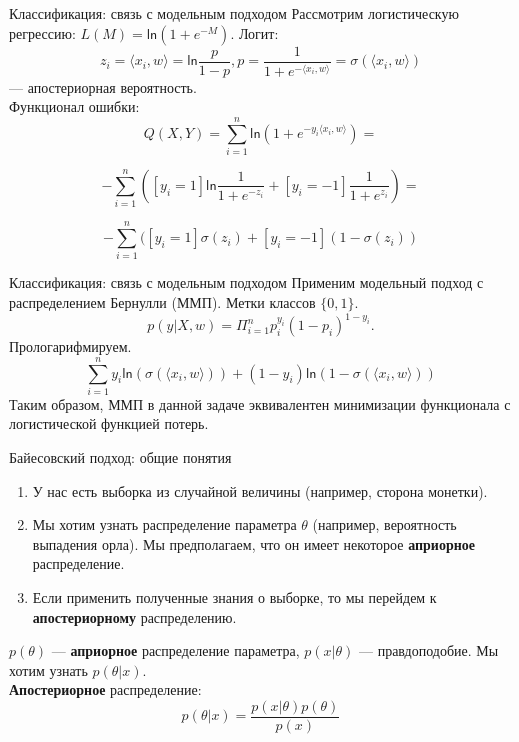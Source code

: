 \documentclass[handout]{beamer}
\begin{document}
\begin{frame}{Классификация: связь с модельным подходом}
	Рассмотрим логистическую регрессию: $L(M)= \mathsf{ln}(1+e^{-M})$.
	Логит:
	\begin{equation}
		z_i=\langle x_i, w\rangle = \mathsf{ln}\frac{p}{1 - p}, p = \frac{1}{1+e^{-\langle x_i, w\rangle}}=\sigma(\langle x_i, w\rangle)
	\end{equation}
	--- апостериорная вероятность. \\
	Функционал ошибки:
	\begin{equation*}
		Q(X, Y) = \sum_{i=1}^{n}\mathsf{ln}(1+e^{-y_i\langle x_i, w\rangle}) =
	\end{equation*}

	\begin{equation*}
 -\sum_{i=1}^n([y_i=1]\mathsf{ln}\frac{1}{1+e^{-z_i}}+[y_i=-1]\frac{1}{1+e^{z_i}})=
	\end{equation*}

	\begin{equation*}
	-\sum_{i=1}^n([y_i=1]\sigma(z_i)+[y_i=-1](1-\sigma(z_i))
	\end{equation*}
\end{frame}

\begin{frame}{Классификация: связь с модельным подходом}
	Применим модельный подход с распределением Бернулли (ММП). Метки классов $\{0, 1\}$.
	\begin{equation}
		p(y|X, w)=\Pi_{i=1}^np_i^{y_i}(1-p_i)^{1-y_i}.
	\end{equation} 
	Прологарифмируем.
	\begin{equation}
		 \sum_{i=1}^ny_i\mathsf{ln}(\sigma(\langle x_i, w\rangle)) + (1-y_i)\mathsf{ln}(1-\sigma(\langle x_i, w\rangle))
	\end{equation}
	Таким образом, ММП в данной задаче эквивалентен минимизации  функционала с логистической функцией потерь.
\end{frame}

\begin{frame}{Байесовский подход: общие понятия}
	\begin{enumerate}
		\item У нас есть выборка из случайной величины (например, сторона монетки).
		\item Мы хотим узнать распределение параметра $\theta$ (например, вероятность выпадения орла). Мы предполагаем, что он имеет некоторое \textbf{априорное} распределение. 
		\item Если применить полученные знания о выборке, то мы перейдем к \textbf{апостериорному} распределению.
	\end{enumerate}
	$p(\theta)$ --- \textbf{априорное} распределение параметра, $p(x|\theta)$ --- правдоподобие. Мы хотим узнать $p(\theta|x)$.\\
	\textbf{Апостериорное} распределение:
	\begin{equation}
		p(\theta|x) = \frac{p(x|\theta)p(\theta)}{p(x)}
	\end{equation}
\end{frame}
\end{document}
